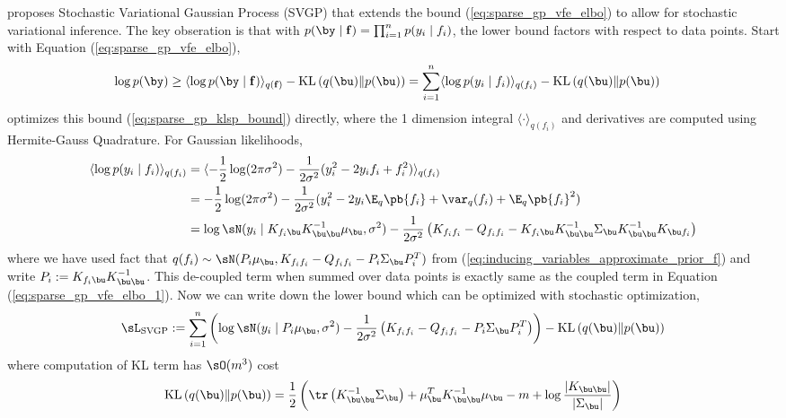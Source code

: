 \documentclass[11pt]{article}
\renewcommand\bf{\ensuremath{\mathbf{f}}}
\begin{document}
\cite{hensmanGaussianProcessesBig2013,hensmanScalableVariationalGaussian2014} proposes Stochastic Variational Gaussian Process (SVGP) that extends the bound (\ref{eq:sparse_gp_vfe_elbo}) to allow for stochastic variational inference. The key obseration is that with $p(\by\mid\bf) = \prod_{i=1}^n p(y_i\mid f_i)$, the lower bound factors with respect to data points. Start with Equation (\ref{eq:sparse_gp_vfe_elbo}),
\begin{align}
    \log p(\by) 
        &\geq \langle \log p(\by\mid\bf) \rangle_{q(\bf)} - \text{KL}\left( q(\bu) \Vert p(\bu) \right) 
        = \sum_{i=1}^n \langle  \log p(y_i\mid f_i) \rangle_{q(f_i)} - \text{KL}\left( q(\bu) \Vert p(\bu) \right) 
        \label{eq:sparse_gp_klsp_bound}
\end{align}
\cite{hensmanScalableVariationalGaussian2014} optimizes this bound (\ref{eq:sparse_gp_klsp_bound}) directly, where the 1 dimension integral $\langle \cdot \rangle_{q(f_i)}$ and derivatives are computed using Hermite-Gauss Quadrature. For Gaussian likelihoods,
\begin{align}
    \langle  \log p(y_i\mid f_i) \rangle_{q(f_i)}
        &= \langle -\frac{1}{2} \log (2\pi \sigma^2) - \frac{1}{2\sigma^2} (y_i^2 - 2y_if_i + f_i^2) \rangle_{q(f_i)} \\
        &=  -\frac{1}{2} \log (2\pi \sigma^2) - \frac{1}{2\sigma^2} (y_i^2 - 2y_i \E_q\pb{f_i}  + \var_q(f_i) + \E_q\pb{f_i}^2 ) \\
        &= \log \sN(y_i \mid K_{f_i\bu} K_{\bu\bu}^{-1} \mu_{\bu}, \sigma^2) - \frac{1}{2\sigma^2} \left( K_{f_if_i} - Q_{f_if_i} - K_{f_i\bu} K_{\bu\bu}^{-1} \Sigma_{\bu} K_{\bu\bu}^{-1} K_{\bu f_i}  \right)
\end{align}
where we have used fact that $q(f_i) \sim \sN(P_i \mu_{\bu}, K_{f_if_i} - Q_{f_if_i} - P_i \Sigma_{\bu} P_i^T )$ from (\ref{eq:inducing_variables_approximate_prior_f}) and write $P_i :=  K_{f_i\bu} K_{\bu\bu}^{-1}$. This de-coupled term when summed over data points is exactly same as the coupled term in Equation (\ref{eq:sparse_gp_vfe_elbo_1}). Now we can write down the lower bound which can be optimized with stochastic optimization,
\begin{align}
    \sL_{\text{SVGP}}
        := \sum_{i=1}^n \left(
            \log \sN(y_i \mid P_i \mu_{\bu}, \sigma^2) - \frac{1}{2\sigma^2} \left( K_{f_if_i} - Q_{f_if_i} - P_i \Sigma_{\bu} P_i^T  \right)
        \right) - \text{KL}\left(q(\bu)\Vert p(\bu)\right)
\end{align}
where computation of KL term has $\sO(m^3)$ cost
\begin{align}
    \text{KL}\left(q(\bu)\Vert p(\bu)\right)
        = \frac{1}{2} \left(
            \tr\left( K_{\bu\bu}^{-1} \Sigma_{\bu} \right) + \mu_{\bu}^T K_{\bu\bu}^{-1} \mu_{\bu} - m + \log \frac{|K_{\bu\bu}|}{|\Sigma_{\bu}|} 
        \right)
\end{align}
\end{document}
